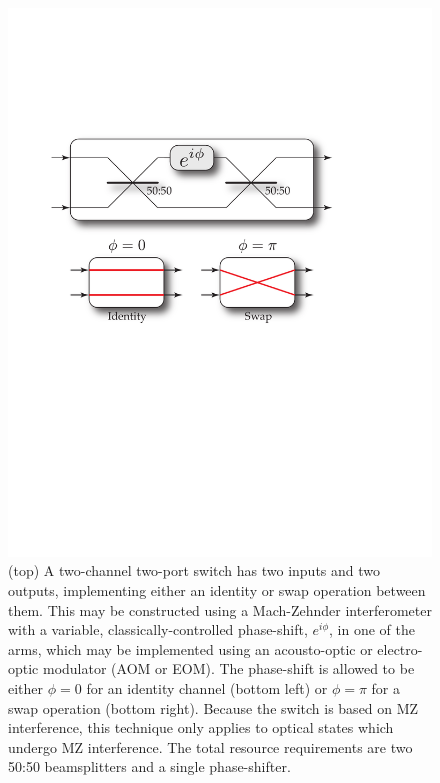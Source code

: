 \documentclass[aps, rmp, twocolumn, amsmath, amssymb, nofootinbib, superscriptaddress, longbibliography, floatfix, table-of-contents, eqsecnum]{revtex4-1}
\begin{document}
\begin{figure}[!htb]
\includegraphics[width=\columnwidth]{two_channel_two_port_switch}
\caption{(top) A two-channel two-port switch has two inputs and two outputs, implementing either an identity or swap operation between them. This may be constructed using a Mach-Zehnder interferometer with a variable, classically-controlled phase-shift, $e^{i\phi}$, in one of the arms, which may be implemented using an acousto-optic or electro-optic modulator (AOM or EOM). The phase-shift is allowed to be either \mbox{$\phi=0$} for an identity channel (bottom left) or \mbox{$\phi=\pi$} for a swap operation (bottom right). Because the switch is based on MZ interference, this technique only applies to optical states which undergo MZ interference. The total resource requirements are two 50:50 beamsplitters and a single phase-shifter.} \label{fig:two_channel_two_port_switch} 
\end{figure}
\end{document}
